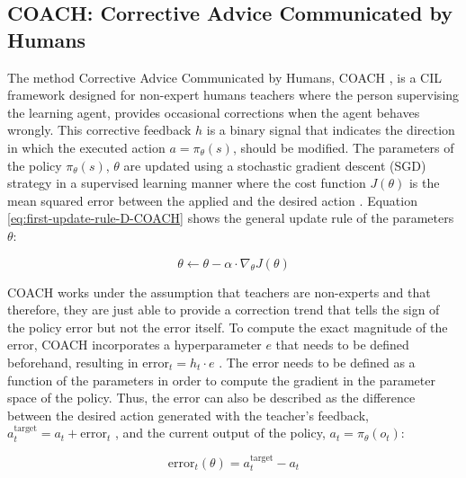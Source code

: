 

\subsection{COACH: Corrective Advice Communicated by Humans}
\label{subsection:COACH}

The method Corrective Advice Communicated by Humans, COACH \cite{COACH-Celemin-Ruiz-del-Solar:2015}, is a CIL framework designed for non-expert humans teachers where the person supervising the learning agent, provides occasional corrections when the agent behaves wrongly. This corrective feedback $h$ is a binary signal that indicates the direction in which the executed action $a = \pi_\theta(s)$, should be modified.
The parameters of the policy $\pi_\theta(s)$, $\theta$ are updated using a stochastic gradient descent (SGD) strategy in a supervised learning manner where the cost function $J(\theta)$ is the mean squared error between the applied and the desired action \cite{Gaussian-COACH-wout:2019}. Equation \eqref{eq:first-update-rule-D-COACH} shows the general update rule of the parameters $\theta$:


\begin{equation}
\theta \leftarrow \theta - \alpha \cdot \nabla_\theta J(\theta)
\label{eq:first-update-rule-D-COACH}
\end{equation}

COACH works under the assumption that teachers are non-experts and that therefore, they are just able to provide a correction trend that tells the sign of the policy error but not the error itself. To compute the exact magnitude of the error, COACH incorporates a hyperparameter $e$ that needs to be defined beforehand, resulting in $\text{error}_t = h_t \cdot e$  \cite{COACH-Celemin-Ruiz-del-Solar:2015}. The error needs to be defined as a function of the parameters in order to compute the gradient in the parameter space of the policy. Thus, the error can also be described as the difference between the desired action generated with the teacher's feedback, $a^\text{target}_t = a_t + \text{error}_t$ , and the current output of the policy, $a_t = \pi_\theta(o_t)$:


\begin{equation}
\text{error}_t(\theta) = a_t^\text{target} - a_t
\label{eq:error-D-COACH}
\end{equation}


